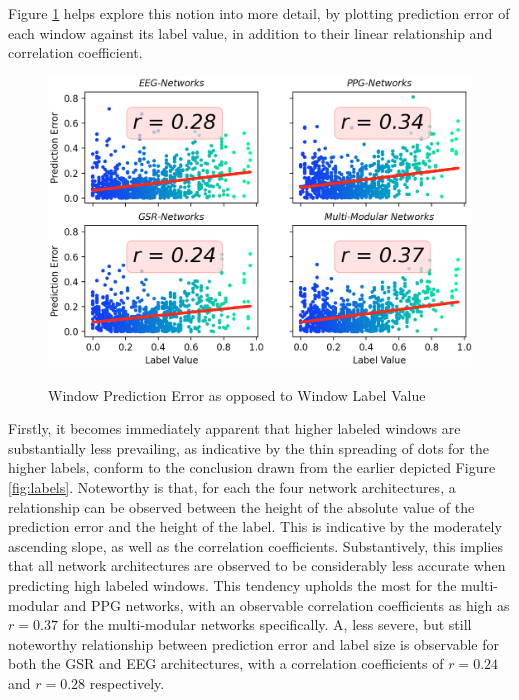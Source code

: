 \documentclass[12pt]{article}
\begin{document}
Figure \ref{fig:mae_scatter} helps explore this notion into more detail,  by plotting prediction error of each window against its label value,  in addition to their linear relationship and correlation coefficient.

\vspace{0.3cm}
\begin{figure}[h]
\caption{Window Prediction Error as opposed to Window Label Value}
\includegraphics[scale=0.64]{mae_scatter.png}
\label{fig:mae_scatter}
\end{figure}

Firstly, it becomes immediately apparent that higher labeled windows are substantially less prevailing, as indicative by the thin spreading of dots for the higher labels, conform to the conclusion drawn from the earlier depicted Figure \ref{fig:labels}. Noteworthy is that, for each the four network architectures, a relationship can be observed between the height of the absolute value of the prediction error and the height of the label. This is indicative by the moderately ascending slope, as well as the correlation coefficients. Substantively, this implies that all network architectures are observed to be considerably less accurate when predicting high labeled windows.  This tendency upholds the most for the multi-modular and PPG networks, with an observable correlation coefficients as high as $r=0.37$ for the multi-modular networks specifically.  A, less severe, but still noteworthy relationship between prediction error and label size is observable for both the GSR and EEG architectures,  with a correlation coefficients of $r=0.24$ and $r=0.28$ respectively.
\end{document}
